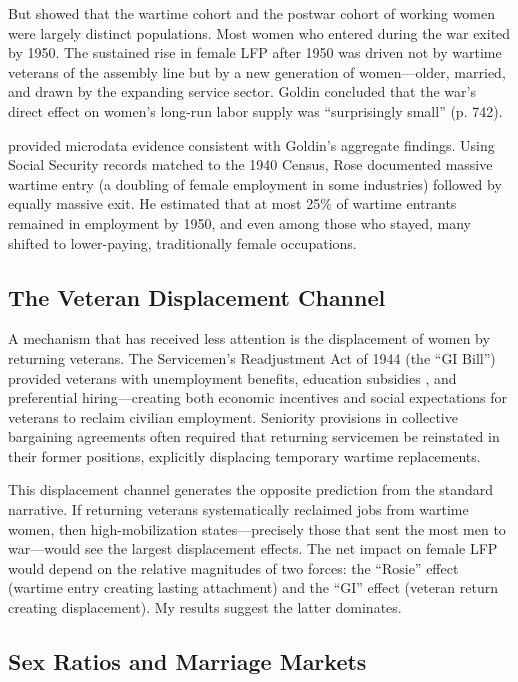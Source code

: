 \documentclass[12pt]{article}
\begin{document}
But \citet{goldin1991role} showed that the wartime cohort and the postwar cohort of working women were largely distinct populations. Most women who entered during the war exited by 1950. The sustained rise in female LFP after 1950 was driven not by wartime veterans of the assembly line but by a new generation of women---older, married, and drawn by the expanding service sector. Goldin concluded that the war's direct effect on women's long-run labor supply was ``surprisingly small'' (p. 742).

\citet{rose2018rise} provided microdata evidence consistent with Goldin's aggregate findings. Using Social Security records matched to the 1940 Census, Rose documented massive wartime entry (a doubling of female employment in some industries) followed by equally massive exit. He estimated that at most 25\% of wartime entrants remained in employment by 1950, and even among those who stayed, many shifted to lower-paying, traditionally female occupations.

\subsection{The Veteran Displacement Channel}

A mechanism that has received less attention is the displacement of women by returning veterans. The Servicemen's Readjustment Act of 1944 (the ``GI Bill'') provided veterans with unemployment benefits, education subsidies \citep{bound2002going}, and preferential hiring---creating both economic incentives and social expectations for veterans to reclaim civilian employment. Seniority provisions in collective bargaining agreements often required that returning servicemen be reinstated in their former positions, explicitly displacing temporary wartime replacements.

This displacement channel generates the opposite prediction from the standard narrative. If returning veterans systematically reclaimed jobs from wartime women, then high-mobilization states---precisely those that sent the most men to war---would see the largest displacement effects. The net impact on female LFP would depend on the relative magnitudes of two forces: the ``Rosie'' effect (wartime entry creating lasting attachment) and the ``GI'' effect (veteran return creating displacement). My results suggest the latter dominates.

\subsection{Sex Ratios and Marriage Markets}
\end{document}
